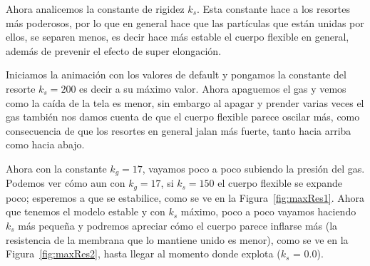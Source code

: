 Ahora analicemos la constante de rigidez $k_s$.
Esta constante hace a los resortes más poderosos, por lo que en general hace que las partículas que están unidas por ellos, se separen menos, es decir hace más estable el cuerpo flexible en general, además de prevenir el efecto de super elongación.

Iniciamos la animación con los valores de default y pongamos la constante del resorte $k_s=200$ es decir a su máximo valor.
Ahora apaguemos el gas y vemos como la caída de la tela es menor, sin embargo al apagar y prender varias veces el gas también nos damos cuenta de que el cuerpo flexible parece oscilar más, como consecuencia de que los resortes en general jalan más fuerte, tanto hacia arriba como hacia abajo.

Ahora con la constante $k_g=17$, vayamos poco a poco subiendo la presión del gas. 
Podemos ver cómo aun con $k_g=17$, si $k_s=150$ el cuerpo flexible se expande poco; esperemos a que se estabilice, como se ve en la Figura~\ref{fig:maxRes1}. 
Ahora que tenemos el modelo estable y con $k_s$ máximo, poco a poco vayamos haciendo $k_s$ más pequeña y podremos apreciar cómo el cuerpo parece inflarse más (la resistencia de la membrana que lo mantiene unido es menor), como se ve en la Figura~\ref{fig:maxRes2}, hasta llegar al momento donde explota ($k_s$ = 0.0).

